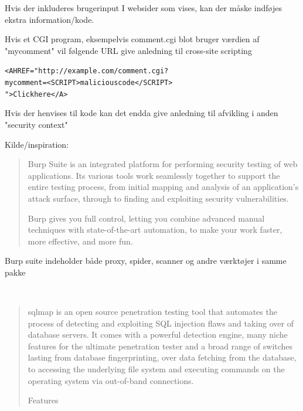 \documentclass[Screen16to9,17pt]{foils}
\begin{document}
\begin{list1}
\item Hvis der inkluderes brugerinput I websider som vises, kan
der måske indføjes ekstra information/kode.
\item Hvis et CGI program, eksempelvis comment.cgi blot bruger værdien af "mycomment" vil
følgende URL give anledning til cross-site scripting
\begin{alltt}
<A HREF="http://example.com/comment.cgi?
mycomment=<SCRIPT>malicious code</SCRIPT>
">Click here</A>
\end{alltt}
\item Hvis der henvises til kode kan det endda give anledning til
afvikling i anden "security context"
\item Kilde/inspiration:
\end{list1}




\begin{quote}
Burp Suite is an integrated platform for performing security testing of web applications. Its various tools work seamlessly together to support the entire testing process, from initial mapping and analysis of an application's attack surface, through to finding and exploiting security vulnerabilities.

Burp gives you full control, letting you combine advanced manual techniques with state-of-the-art automation, to make your work faster, more effective, and more fun.
\end{quote}

Burp suite indeholder både proxy, spider, scanner og andre værktøjer i samme pakke

\\


\begin{quote}\small
sqlmap is an open source penetration testing tool that automates the process of detecting and exploiting SQL injection flaws and taking over of database servers. It comes with a powerful detection engine, many niche features for the ultimate penetration tester and a broad range of switches lasting from database fingerprinting, over data fetching from the database, to accessing the underlying file system and executing commands on the operating system via out-of-band connections.

Features
\end{quote}
\end{document}
